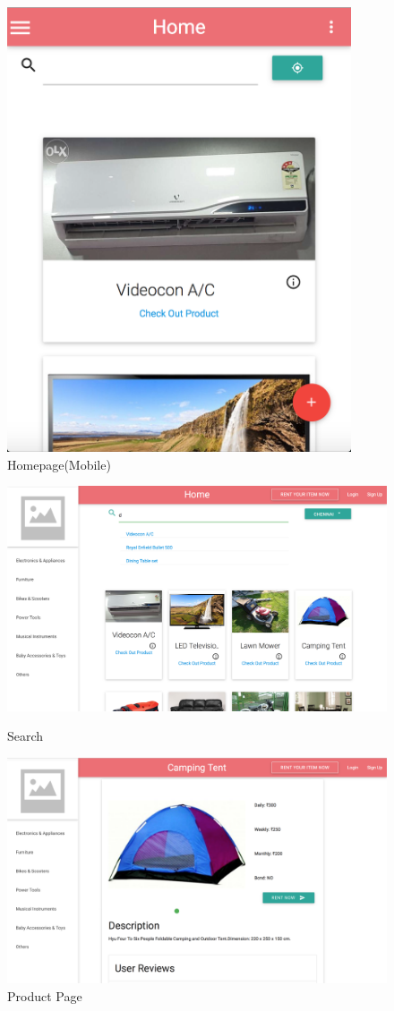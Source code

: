 \documentclass[11pt]{report}
\begin{document}
    \begin{figure}[h]
  \centering
    \includegraphics[width=4in]{homepage_mobile.png} 
	\caption{Homepage(Mobile)}
	\end{figure}
    \begin{figure}[h]
  \centering
    \includegraphics[width=6in]{search.png} 
	\caption{Search}
\vspace{0.5in}
  \centering
    \includegraphics[width=6in]{product.png} 
	\caption{Product Page}
	\end{figure}
\end{document}
